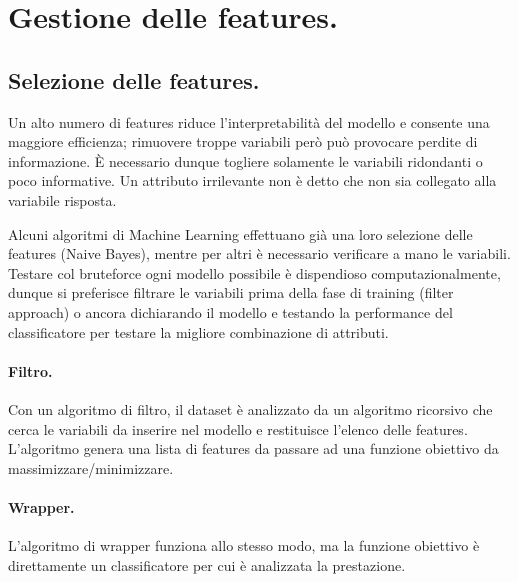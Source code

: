 \documentclass[11pt, a4page, twocolumn]{article}
\begin{document}
\section{Gestione delle features.}

\subsection{Selezione delle features.}
Un alto numero di features riduce l'interpretabilità del modello e consente una maggiore efficienza; rimuovere troppe variabili però può provocare perdite di informazione.
È necessario dunque togliere solamente le variabili ridondanti o poco informative.
Un attributo irrilevante non è detto che non sia collegato alla variabile risposta. \newline

Alcuni algoritmi di Machine Learning effettuano già una loro selezione delle features (Naive Bayes), mentre per altri è necessario verificare a mano le variabili.
Testare col bruteforce ogni modello possibile è dispendioso computazionalmente, dunque si preferisce filtrare le variabili prima della fase di training (filter approach) o ancora dichiarando il modello e testando la performance del classificatore per testare la migliore combinazione di attributi.

\paragraph{Filtro.}
Con un algoritmo di filtro, il dataset è analizzato da un algoritmo ricorsivo che cerca le variabili da inserire nel modello e restituisce l'elenco delle features.
L'algoritmo genera una lista di features da passare ad una funzione obiettivo da massimizzare/minimizzare.

\paragraph{Wrapper.}
L'algoritmo di wrapper funziona allo stesso modo, ma la funzione obiettivo è direttamente un classificatore per cui è analizzata la prestazione. \newline
\end{document}
